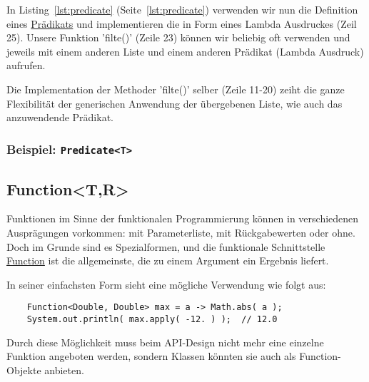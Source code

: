 In Listing~\ref{lst:predicate} (Seite~\ref{lst:predicate}) verwenden wir nun
die Definition eines
\href{https://docs.oracle.com/en/java/javase/11/docs/api/java.base/java/util/function/Predicate.html}
{Prädikats} und implementieren die in Form eines Lambda Ausdruckes (Zeil 25). Unsere Funktion
'filte()' (Zeile 23) können wir beliebig oft verwenden und jeweils mit einem anderen Liste und einem
anderen Prädikat (Lambda Ausdruck) aufrufen.

Die Implementation der Methoder 'filte()' selber (Zeile 11-20) zeiht die ganze Flexibilität
der generischen Anwendung der übergebenen Liste, wie auch das anzuwendende Prädikat.


\begin{frame}[fragile]
    \frametitle<presentation>{Beispiel: \texttt{Predicate<T>}}

\end{frame}

\mode*
{}


\subsection{Function<T,R>}
\label{subsec:function}

Funktionen im Sinne der funktionalen Programmierung können in verschiedenen
Ausprägungen vorkommen: mit Parameterliste, mit Rückgabewerten oder ohne.
Doch im Grunde sind es Spezialformen, und die funktionale Schnittstelle
\href{https://docs.oracle.com/en/java/javase/11/docs/api/java.base/java/util/function/Function.html}
{Function} ist die allgemeinste, die zu einem Argument
ein Ergebnis liefert.

In seiner einfachsten Form sieht eine mögliche Verwendung wie folgt aus:

\begin{verbatim}
    Function<Double, Double> max = a -> Math.abs( a );
    System.out.println( max.apply( -12. ) );  // 12.0
\end{verbatim}

Durch diese Möglichkeit muss beim API-Design nicht mehr eine einzelne Funktion
angeboten werden, sondern Klassen könnten sie auch als Function-Objekte anbieten.

